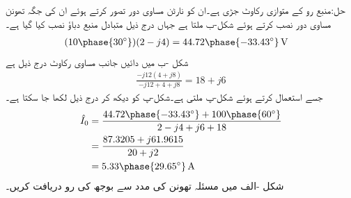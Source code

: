 حل:منبع رو کے متوازی رکاوٹ  جڑی ہے۔ان کو نارٹن مساوی دور تصور کرتے ہوئے ان کی جگہ  تھونن مساوی  دور نصب کرتے ہوئے شکل-ب ملتا ہے جہاں درج ذیل متبادل منبع دباؤ نصب کیا گیا ہے۔
\begin{align*}
(10\phase{30^{\circ}})(2-j4)&=44.72\phase{-33.43^{\circ}}\,\si{\volt}
\end{align*}
شکل -ب میں دائیں جانب مساوی رکاوٹ درج ذیل ہے
\begin{align*}
\frac{-j12(4+j8)}{-j12+4+j8}=18+j6
\end{align*}
جسے استعمال کرتے ہوئے شکل-پ ملتی ہے۔شکل-پ کو دیکھ کر درج ذیل لکھا جا سکتا ہے۔
\begin{align*}
\hat{I}_0&=\frac{44.72\phase{-33.43^{\circ}}+100\phase{60^{\circ}}}{2-j4+j6+18}\\
&=\frac{87.3205+j61.9615}{20+j2}\\
&=5.33\phase{29.65^{\circ}}\,\si{\ampere}
\end{align*}
شکل -الف میں مسئلہ تھونن کی مدد سے بوجھ کی رو  دریافت کریں۔

